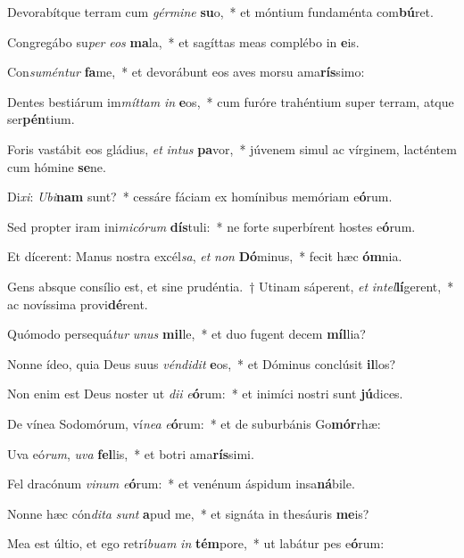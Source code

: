 \item Devorabítque terram cum \textit{gér}\textit{mi}\textit{ne} \textbf{su}o,~* et móntium fundaménta com\textbf{bú}ret.
\item Congregábo su\textit{per} \textit{e}\textit{os} \textbf{ma}la,~* et sagíttas meas complébo in \textbf{e}is.
\item Con\textit{su}\textit{mén}\textit{tur} \textbf{fa}me,~* et devorábunt eos aves morsu ama\textbf{rís}simo:
\item Dentes bestiárum im\textit{mít}\textit{tam} \textit{in} \textbf{e}os,~* cum furóre trahéntium super terram, atque ser\textbf{pén}tium.
\item Foris vastábit eos gládius, \textit{et} \textit{in}\textit{tus} \textbf{pa}vor,~* júvenem simul ac vírginem, lacténtem cum hómine \textbf{se}ne.
\item Di\textit{xi}: \textit{U}\textit{bi}\textbf{nam} sunt?~* cessáre fáciam ex homínibus memóriam e\textbf{ó}rum.
\item Sed propter iram ini\textit{mi}\textit{có}\textit{rum} \textbf{dís}tuli:~* ne forte superbírent hostes e\textbf{ó}rum.
\item Et dícerent: Manus nostra excél\textit{sa}, \textit{et} \textit{non} \textbf{Dó}minus,~* fecit hæc \textbf{óm}nia.
\item Gens absque consílio est, et sine prudéntia.~† Utinam sáperent, \textit{et} \textit{in}\textit{tel}\textbf{lí}gerent,~* ac novíssima provi\textbf{dé}rent.
\item Quómodo persequá\textit{tur} \textit{u}\textit{nus} \textbf{mil}le,~* et duo fugent decem \textbf{míl}lia?
\item Nonne ídeo, quia Deus suus \textit{vén}\textit{di}\textit{dit} \textbf{e}os,~* et Dóminus conclúsit \textbf{il}los?
\item Non enim est Deus noster ut \textit{di}\textit{i} \textit{e}\textbf{ó}rum:~* et inimíci nostri sunt \textbf{jú}dices.
\item De vínea Sodomórum, ví\textit{ne}\textit{a} \textit{e}\textbf{ó}rum:~* et de suburbánis Go\textbf{mór}rhæ:
\item Uva eó\textit{rum}, \textit{u}\textit{va} \textbf{fel}lis,~* et botri ama\textbf{rís}simi.
\item Fel dracónum \textit{vi}\textit{num} \textit{e}\textbf{ó}rum:~* et venénum áspidum insa\textbf{ná}bile.
\item Nonne hæc cón\textit{di}\textit{ta} \textit{sunt} \textbf{a}pud me,~* et signáta in thesáuris \textbf{me}is?
\item Mea est últio, et ego retrí\textit{bu}\textit{am} \textit{in} \textbf{tém}pore,~* ut labátur pes e\textbf{ó}rum:
